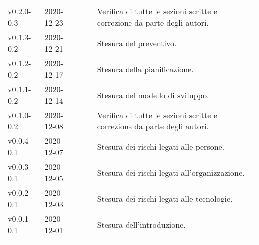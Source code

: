 {\begin{longtable}{C{.131777\freewidth} C{.134036\freewidth} C{.263554\freewidth} C{.188254\freewidth} C{.282379\freewidth}}
		v0.2.0-0.3 & 2020-12-23 & \Giosue{} & \ver{} & Verifica di tutte le sezioni scritte e correzione da parte degli autori. \\
		v0.1.3-0.2 & 2020-12-21 & \Tommaso{} & \ana{} & Stesura del preventivo. \\
		v0.1.2-0.2 & 2020-12-17 & \Tommaso{} & \ana{} & Stesura della pianificazione. \\
		v0.1.1-0.2 & 2020-12-14 & \Matteo{} & \ana{} & Stesura del modello di sviluppo. \\

		v0.1.0-0.2 & 2020-12-08 & \Davide & \ver{} & Verifica di tutte le sezioni scritte e correzione da parte degli autori. \\
		v0.0.4-0.1 & 2020-12-07 & \Matteo{} & \ana{} & Stesura dei rischi legati alle persone. \\
		v0.0.3-0.1 & 2020-12-05 & \Matteo{} & \ana{} & Stesura dei rischi legati all'organizzazione. \\
		v0.0.2-0.1 & 2020-12-03 & \Matteo{} & \ana{} & Stesura dei rischi legati alle tecnologie. \\
		v0.0.1-0.1 & 2020-12-01 & \Tommaso{} & \ana{} & Stesura dell'introduzione. \\
		
		\bottomrule
		\hiderowcolors
	\end{longtable}
}
